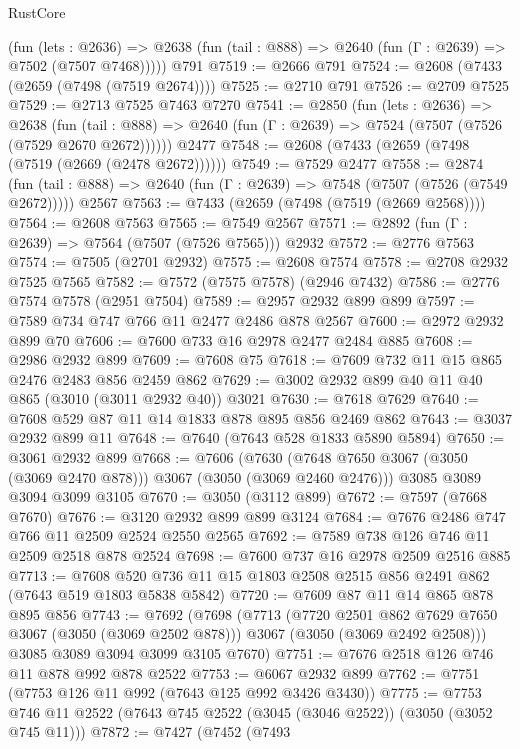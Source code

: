 \begin{lexlean}{RustCore}
\begin{coremodule}
      (fun (lets : @2636) =>
      @2638 (fun (tail : @888) => @2640 (fun (Γ : @2639) => @7502 (@7507 @7468)))))
    @791
@7519 := @2666 @791
@7524 := @2608 (@7433 (@2659 (@7498 (@7519 @2674))))
@7525 := @2710 @791
@7526 := @2709 @7525
@7529 := @2713 @7525 @7463 @7270
@7541 := @2850
    (fun (lets : @2636) =>
    @2638
      (fun (tail : @888) => @2640 (fun (Γ : @2639) => @7524 (@7507 (@7526 (@7529 @2670 @2672))))))
    @2477
@7548 := @2608 (@7433 (@2659 (@7498 (@7519 (@2669 (@2478 @2672))))))
@7549 := @7529 @2477
@7558 := @2874
    (fun (tail : @888) => @2640 (fun (Γ : @2639) => @7548 (@7507 (@7526 (@7549 @2672)))))
    @2567
@7563 := @7433 (@2659 (@7498 (@7519 (@2669 @2568))))
@7564 := @2608 @7563
@7565 := @7549 @2567
@7571 := @2892 (fun (Γ : @2639) => @7564 (@7507 (@7526 @7565))) @2932
@7572 := @2776 @7563
@7574 := @7505 (@2701 @2932)
@7575 := @2608 @7574
@7578 := @2708 @2932 @7525 @7565
@7582 := @7572 (@7575 @7578) (@2946 @7432)
@7586 := @2776 @7574 @7578 (@2951 @7504)
@7589 := @2957 @2932 @899 @899
@7597 := @7589 @734 @747 @766 @11 @2477 @2486 @878 @2567
@7600 := @2972 @2932 @899 @70
@7606 := @7600 @733 @16 @2978 @2477 @2484 @885
@7608 := @2986 @2932 @899
@7609 := @7608 @75
@7618 := @7609 @732 @11 @15 @865 @2476 @2483 @856 @2459 @862
@7629 := @3002 @2932 @899 @40 @11 @40 @865 (@3010 (@3011 @2932 @40)) @3021
@7630 := @7618 @7629
@7640 := @7608 @529 @87 @11 @14 @1833 @878 @895 @856 @2469 @862
@7643 := @3037 @2932 @899 @11
@7648 := @7640 (@7643 @528 @1833 @5890 @5894)
@7650 := @3061 @2932 @899
@7668 := @7606
    (@7630 (@7648 @7650 @3067 (@3050 (@3069 @2470 @878))) @3067 (@3050 (@3069 @2460 @2476)))
    @3085
    @3089
    @3094
    @3099
    @3105
@7670 := @3050 (@3112 @899)
@7672 := @7597 (@7668 @7670)
@7676 := @3120 @2932 @899 @899 @3124
@7684 := @7676 @2486 @747 @766 @11 @2509 @2524 @2550 @2565
@7692 := @7589 @738 @126 @746 @11 @2509 @2518 @878 @2524
@7698 := @7600 @737 @16 @2978 @2509 @2516 @885
@7713 := @7608 @520 @736 @11 @15 @1803 @2508 @2515 @856 @2491 @862 (@7643 @519 @1803 @5838 @5842)
@7720 := @7609 @87 @11 @14 @865 @878 @895 @856
@7743 := @7692
    (@7698
      (@7713
        (@7720 @2501 @862 @7629 @7650 @3067 (@3050 (@3069 @2502 @878)))
        @3067
        (@3050 (@3069 @2492 @2508)))
      @3085
      @3089
      @3094
      @3099
      @3105
      @7670)
@7751 := @7676 @2518 @126 @746 @11 @878 @992 @878 @2522
@7753 := @6067 @2932 @899
@7762 := @7751 (@7753 @126 @11 @992 (@7643 @125 @992 @3426 @3430))
@7775 := @7753 @746 @11 @2522 (@7643 @745 @2522 (@3045 (@3046 @2522)) (@3050 (@3052 @745 @11)))
@7872 := @7427
    (@7452
      (@7493

\end{coremodule}
\end{lexlean}
